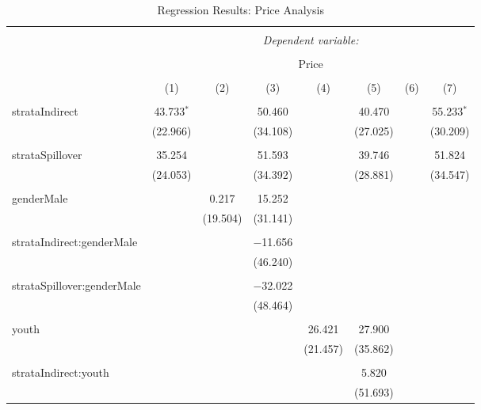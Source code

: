 
\begin{sidewaystable}[!htbp] \centering 
  \caption{Regression Results: Price Analysis} 
  \label{tab:regression_results} 
\small 
\begin{tabular}{@{\extracolsep{15pt}}lccccccc} 
\\[-1.8ex]\hline 
\hline \\[-1.8ex] 
 & \multicolumn{7}{c}{\textit{Dependent variable:}} \\ 
\cline{2-8} 
\\[-1.8ex] & \multicolumn{7}{c}{Price} \\ 
\\[-1.8ex] & (1) & (2) & (3) & (4) & (5) & (6) & (7)\\ 
\hline \\[-1.8ex] 
 strataIndirect & 43.733$^{*}$ &  & 50.460 &  & 40.470 &  & 55.233$^{*}$ \\ 
  & (22.966) &  & (34.108) &  & (27.025) &  & (30.209) \\ 
  & & & & & & & \\ 
 strataSpillover & 35.254 &  & 51.593 &  & 39.746 &  & 51.824 \\ 
  & (24.053) &  & (34.392) &  & (28.881) &  & (34.547) \\ 
  & & & & & & & \\ 
 genderMale &  & 0.217 & 15.252 &  &  &  &  \\ 
  &  & (19.504) & (31.141) &  &  &  &  \\ 
  & & & & & & & \\ 
 strataIndirect:genderMale &  &  & $-$11.656 &  &  &  &  \\ 
  &  &  & (46.240) &  &  &  &  \\ 
  & & & & & & & \\ 
 strataSpillover:genderMale &  &  & $-$32.022 &  &  &  &  \\ 
  &  &  & (48.464) &  &  &  &  \\ 
  & & & & & & & \\ 
 youth &  &  &  & 26.421 & 27.900 &  &  \\ 
  &  &  &  & (21.457) & (35.862) &  &  \\ 
  & & & & & & & \\ 
 strataIndirect:youth &  &  &  &  & 5.820 &  &  \\ 
  &  &  &  &  & (51.693) &  &  \\ 

\end{tabular}
\end{sidewaystable}

